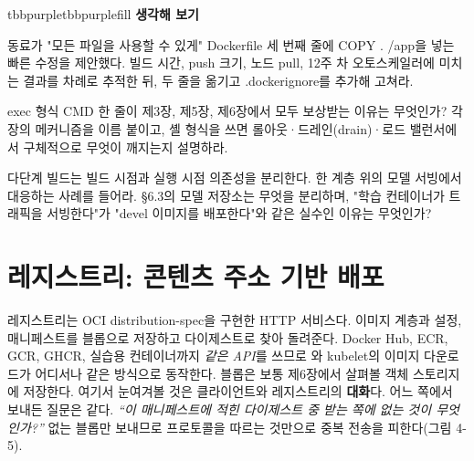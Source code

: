 \begin{calloutbox}{tbbpurple}{tbbpurplefill}
{\normalsize\bfseries\color{tbbpurple}생각해 보기}\par\vspace{3pt}
\begin{tbbitemize}
  \item 동료가 "모든 파일을 사용할 수 있게" Dockerfile 세 번째 줄에 COPY . /app을 넣는 빠른 수정을 제안했다. 빌드 시간, push 크기, 노드 pull, 12주 차 오토스케일러에 미치는 결과를 차례로 추적한 뒤, 두 줄을 옮기고 .dockerignore를 추가해 고쳐라.
  \item exec 형식 CMD 한 줄이 제3장, 제5장, 제6장에서 모두 보상받는 이유는 무엇인가? 각 장의 메커니즘을 이름 붙이고, 셸 형식을 쓰면 롤아웃·드레인(drain)·로드 밸런서에서 구체적으로 무엇이 깨지는지 설명하라.
  \item 다단계 빌드는 빌드 시점과 실행 시점 의존성을 분리한다. 한 계층 위의 모델 서빙에서 대응하는 사례를 들어라. §6.3의 모델 저장소는 무엇을 분리하며, "학습 컨테이너가 트래픽을 서빙한다"가 "devel 이미지를 배포한다"와 같은 실수인 이유는 무엇인가?
\end{tbbitemize}
\end{calloutbox}

\section{레지스트리: 콘텐츠 주소 기반 배포}

레지스트리는 OCI distribution-spec을 구현한 HTTP 서비스다. 이미지 계층과 설정, 매니페스트를 블롭으로 저장하고 다이제스트로 찾아 돌려준다. Docker Hub, ECR, GCR, GHCR, 실습용  컨테이너까지 \textit{같은 API}를 쓰므로 와 kubelet의 이미지 다운로드가 어디서나 같은 방식으로 동작한다. 블롭은 보통 제6장에서 살펴볼 객체 스토리지에 저장한다. 여기서 눈여겨볼 것은 클라이언트와 레지스트리의 \textbf{대화}다. 어느 쪽에서 보내든 질문은 같다. \textit{“이 매니페스트에 적힌 다이제스트 중 받는 쪽에 없는 것이 무엇인가?”} 없는 블롭만 보내므로 프로토콜을 따르는 것만으로 중복 전송을 피한다(그림 4-5).

